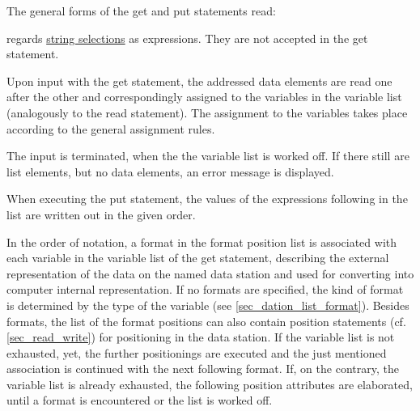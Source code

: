 The general forms of the get and put statements read:

\begin{grammarframe}





\end{grammarframe}

\OpenPEARL{} regards \hyperlink{StringSelection}{string selections} as
expressions. They are not accepted in the get statement.

Upon input with the get statement, the addressed data elements are
read one after the other and correspondingly assigned to the variables
in the variable list (analogously to the read statement). The
assignment to the variables takes place according to the general
assignment rules.

The input is terminated, when the the variable list is worked off. If
there still are list elements, but no data elements, an error message is
displayed.

When executing the put statement, the values of the expressions
following  in the list are written out in the given order.

In the order of notation, a format in the format position list is
associated with each variable in the variable list of the get
statement, describing the external representation of the data on the
named data station and used for converting into computer internal
representation. 
If no formats are specified, the kind of format is determined by the
type of the variable (see  \ref{sec_dation_list_format}).
Besides formats, the list of the format positions can also
contain position statements (cf. \ref{sec_read_write})
for positioning in the data
station. If the variable list is not exhausted, yet, the further
positionings are executed and the just mentioned association is
continued with the next following format. If, on the contrary, the
variable list is already exhausted, the following position attributes
are elaborated, until a format is encountered or the list is worked off.

